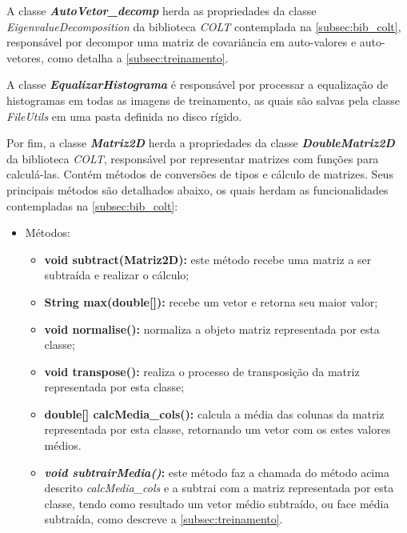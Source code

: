 A classe \textit{\textbf{AutoVetor\_decomp}} herda as propriedades da classe \textit{EigenvalueDecomposition} da biblioteca \textit{COLT} contemplada na \autoref{subsec:bib_colt}, responsável por decompor uma matriz de covariância em auto-valores e auto-vetores, como detalha a \autoref{subsec:treinamento}.


A classe \textit{\textbf{EqualizarHistograma}} é responsável por processar a equalização de histogramas em todas as imagens de treinamento, as quais são salvas pela classe \textit{FileUtils} em uma pasta definida no disco rígido.


Por fim, a classe \textit{\textbf{Matriz2D}} herda a propriedades da classe \textit{\textbf{DoubleMatriz2D }} da biblioteca \textit{COLT}, responsável por representar matrizes com funções para calculá-las. Contém métodos de conversões de tipos e cálculo de matrizes. Seus principais métodos são detalhados abaixo, os quais herdam as funcionalidades contempladas na \autoref{subsec:bib_colt}:
\begin{itemize}	
	\item Métodos:
	\begin{itemize}
		\item \textbf{void subtract(Matriz2D):} este método recebe uma matriz a ser subtraída e realizar o cálculo;
		
		\item \textbf{String max(double[]):} recebe um vetor e retorna seu maior valor;
		
		\item \textbf{void normalise():} normaliza a objeto matriz representada por esta classe;
		
		\item \textbf{void transpose():} realiza o processo de transposição da matriz representada por esta classe;
		
		\item \textbf{double[] calcMedia\_cols():} calcula a média das colunas da matriz representada por esta classe, retornando um vetor com os estes valores médios.
		
		\item \textbf{\textit{void subtrairMedia()}:} este método faz a chamada do método acima descrito 		 \textit{calcMedia\_cols} e a subtrai com a matriz representada por esta classe, tendo como resultado um vetor médio subtraído, ou face média subtraída, como descreve a \autoref{subsec:treinamento}.

	\end{itemize}
\end{itemize}



